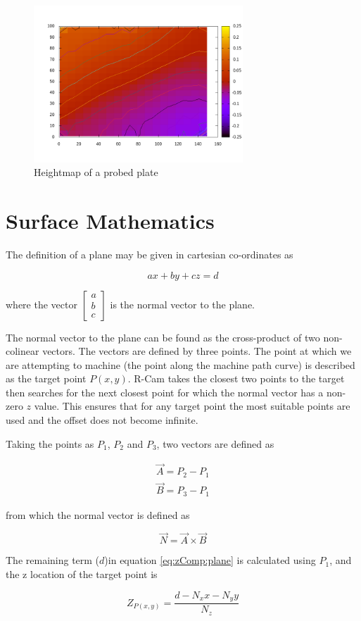 \begin{figure}[h]
  \centering
  \includegraphics[width=0.7\textwidth]{figures/probeHeightmap.png}
  \caption{Heightmap of a probed plate}
  \label{fig:zComp:probeHeightmap}
\end{figure}

\section{Surface Mathematics}

The definition of a plane may be given in cartesian co-ordinates as

\begin{equation}
ax+by+cz=d
\label{eq:zComp:plane}
\end{equation}

where the vector $\left[ {\begin{array}{c} a \\ b \\ c \end{array}} \right]$ is the normal vector to the plane.

The normal vector to the plane can be found as the cross-product of two non-colinear vectors. The vectors are defined by three points. The point at which we are attempting to machine (the point along the machine path curve) is described as the target point $P(x,y)$. R-Cam takes the closest two points to the target then searches for the next closest point for which the normal vector has a non-zero $z$ value. This ensures that for any target point the most suitable points are used and the offset does not become infinite.

Taking the points as $P_1$, $P_2$ and $P_3$, two vectors are defined as

\begin{eqnarray}
\vec{A}=P_2-P_1 \\
\vec{B}=P_3-P_1
\end{eqnarray}

from which the normal vector is defined as

\begin{equation}
\vec{N}=\vec{A} \times \vec{B}
\end{equation}

The remaining term ($d$)in equation \ref{eq:zComp:plane} is calculated using $P_1$, and the z location of the target point is

\begin{equation}
Z_{P(x,y)}=\frac{d-{N_x}x-{N_y}y}{N_z}
\end{equation}
